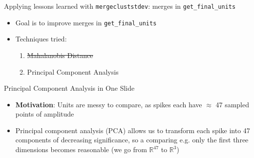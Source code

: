 \documentclass[11pt,handout]{beamer}
\begin{document}
    \begin{frame}{Applying lessons learned with \texttt{mergecluststdev}: merges
in \texttt{get\_final\_units}}
    \begin{itemize}
        \pause
        \item Goal is to improve merges in \texttt{get\_final\_units}
        \pause
        \item Techniques tried:
        \begin{enumerate}
            \pause
            \item \sout{Mahalanobis Distance}
            \item {Principal Component Analysis}
        \end{enumerate}
     \end{itemize}
    \end{frame} 
    
    \begin{frame}{Principal Component Analysis in One Slide}
        \begin{itemize}
            \pause
            \item \textbf{Motivation}: Units are messy to compare, as spikes
each have \ensuremath{\approx} 47 sampled points of amplitude
            \pause
            \item Principal component analysis (PCA) allows us to transform each
spike into 47 components of decreasing significance, so a comparing e.g. only
the first three dimensions becomes reasonable (we go from
\ensuremath{\mathbb{R}^{47}} to \ensuremath{\mathbb{R}^3})
         \end{itemize}
    \end{frame}
     
\end{document}
